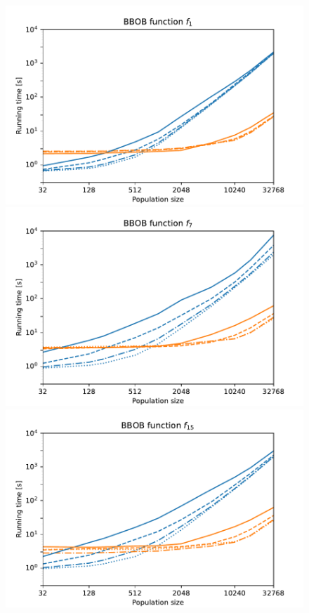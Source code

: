 \begin{figure}[ht!]
    \centering
    \begin{minipage}[t]{0.32\textwidth}
        \centering
        \includegraphics[width=\textwidth]{img/runs/time_pso2011_fn1_alldim.pdf}
    \end{minipage}
    \hfill
    \begin{minipage}[t]{0.32\textwidth}
        \centering
        \includegraphics[width=\textwidth]{img/runs/time_pso2011_fn7_alldim.pdf}
    \end{minipage}
    \hfill
    \begin{minipage}[t]{0.32\textwidth}
        \centering
        \includegraphics[width=\textwidth]{img/runs/time_pso2011_fn15_alldim.pdf}

\end{minipage}
\end{figure}

